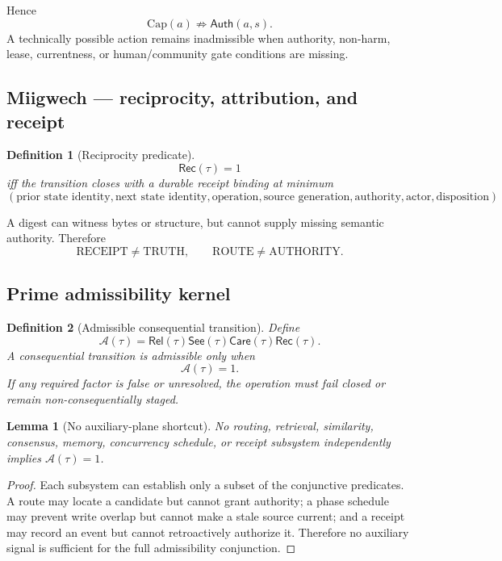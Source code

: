 \documentclass[11pt]{article}
\newtheorem{definition}{Definition}
\newtheorem{lemma}{Lemma}
\newcommand{\Rel}{\mathsf{Rel}}
\newcommand{\See}{\mathsf{See}}
\newcommand{\Care}{\mathsf{Care}}
\newcommand{\Rec}{\mathsf{Rec}}
\newcommand{\Auth}{\mathsf{Auth}}
\begin{document}
Hence
\[
\mathrm{Cap}(a)\not\Rightarrow\Auth(a,s).
\]
A technically possible action remains inadmissible when authority, non-harm,
lease, currentness, or human/community gate conditions are missing.

\subsection{Miigwech --- reciprocity, attribution, and receipt}

\begin{definition}[Reciprocity predicate]
\[
\Rec(\tau)=1
\]
iff the transition closes with a durable receipt binding at minimum
\[
(\text{prior state identity},\text{next state identity},\text{operation},
\text{source generation},\text{authority},\text{actor},\text{disposition}).
\]
\end{definition}

A digest can witness bytes or structure, but cannot supply missing semantic
authority.  Therefore
\[
\mathrm{RECEIPT}\neq\mathrm{TRUTH},\qquad
\mathrm{ROUTE}\neq\mathrm{AUTHORITY}.
\]

\subsection{Prime admissibility kernel}

\begin{definition}[Admissible consequential transition]
Define
\[
\mathcal{A}(\tau)=\Rel(\tau)\See(\tau)\Care(\tau)\Rec(\tau).
\]
A consequential transition is admissible only when
\[
\mathcal{A}(\tau)=1.
\]
If any required factor is false or unresolved, the operation must fail closed or
remain non-consequentially staged.
\end{definition}

\begin{lemma}[No auxiliary-plane shortcut]
No routing, retrieval, similarity, consensus, memory, concurrency schedule, or
receipt subsystem independently implies \(\mathcal{A}(\tau)=1\).
\end{lemma}

\begin{proof}
Each subsystem can establish only a subset of the conjunctive predicates.  A
route may locate a candidate but cannot grant authority; a phase schedule may
prevent write overlap but cannot make a stale source current; and a receipt may
record an event but cannot retroactively authorize it.  Therefore no auxiliary
signal is sufficient for the full admissibility conjunction.
\end{proof}
\end{document}
